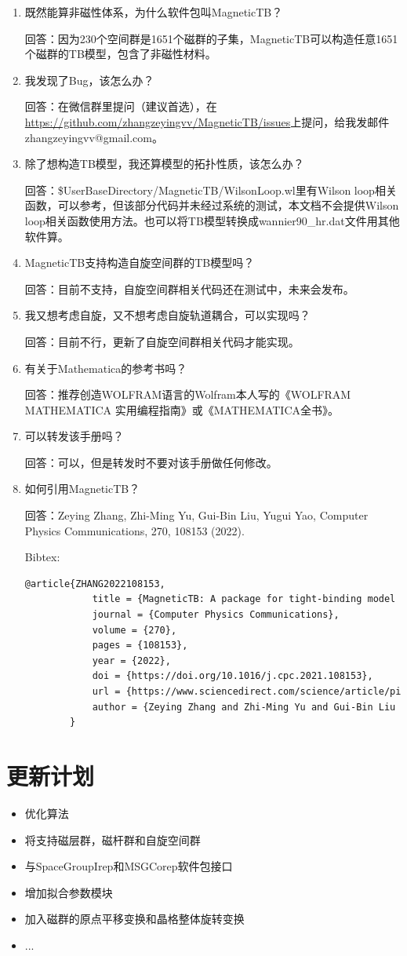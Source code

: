 \documentclass[titlepage,a4paper,12pt,AutoFakeBold]{article}
\newcommand\litem[1]{\item{ #1？\\}}
\begin{document}
\begin{enumerate}[style=nextline]
	\litem{既然能算非磁性体系，为什么软件包叫\textsf{MagneticTB}}
	
	回答：因为230个空间群是1651个磁群的子集，\textsf{MagneticTB}可以构造任意1651个磁群的TB模型，包含了非磁性材料。
	

	
	\litem{我发现了Bug，该怎么办}
	
	回答：在微信群里提问（建议首选），在\url{https://github.com/zhangzeyingvv/MagneticTB/issues}上提问，给我发邮件zhangzeyingvv@gmail.com。
	
	\litem{除了想构造TB模型，我还算模型的拓扑性质，该怎么办}
	
	回答：\$UserBaseDirectory/MagneticTB/WilsonLoop.wl里有Wilson loop相关函数，可以参考，但该部分代码并未经过系统的测试，本文档不会提供Wilson loop相关函数使用方法。也可以将TB模型转换成wannier90\_hr.dat文件用其他软件算。
	
	
	\litem{\textsf{MagneticTB}支持构造自旋空间群的TB模型吗}

	回答：目前不支持，自旋空间群相关代码还在测试中，未来会发布。

	\litem{我又想考虑自旋，又不想考虑自旋轨道耦合，可以实现吗}
	
	回答：目前不行，更新了自旋空间群相关代码才能实现。

	\litem{有关于Mathematica的参考书吗}
	
	回答：推荐创造WOLFRAM语言的Wolfram本人写的《WOLFRAM  MATHEMATICA 实用编程指南》或《MATHEMATICA全书》。	
		
	\litem{可以转发该手册吗}

	回答：可以，但是转发时不要对该手册做任何修改。

	\litem{如何引用\textsf{MagneticTB}}

    回答：Zeying Zhang, Zhi-Ming Yu, Gui-Bin Liu, Yugui Yao,
    Computer Physics Communications,
    270,
    108153 (2022).
    
    Bibtex:
    \begin{lstlisting}[numbers=none,language=TeX]
    	@article{ZHANG2022108153,
    		title = {MagneticTB: A package for tight-binding model of magnetic and non-magnetic materials},
    		journal = {Computer Physics Communications},
    		volume = {270},
    		pages = {108153},
    		year = {2022},
    		doi = {https://doi.org/10.1016/j.cpc.2021.108153},
    		url = {https://www.sciencedirect.com/science/article/pii/S0010465521002654},
    		author = {Zeying Zhang and Zhi-Ming Yu and Gui-Bin Liu and Yugui Yao}
    	}
    \end{lstlisting}
\end{enumerate}

\section{更新计划}
\begin{itemize}
	\item	优化算法
	\item	将支持磁层群，磁杆群和自旋空间群
	\item	与\textsf{SpaceGroupIrep}和\textsf{MSGCorep}软件包接口
	\item	增加拟合参数模块
	\item	加入磁群的原点平移变换和晶格整体旋转变换
	\item	...
\end{itemize}
\end{document}
